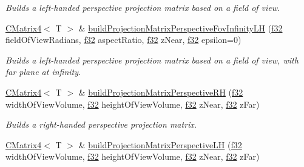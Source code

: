 \begin{DoxyCompactItemize}
\begin{DoxyCompactList}\small\item\em Builds a left-\/handed perspective projection matrix based on a field of view. \end{DoxyCompactList}\item 
\hyperlink{classirr_1_1core_1_1CMatrix4}{C\+Matrix4}$<$ T $>$ \& \hyperlink{classirr_1_1core_1_1CMatrix4_a3e4c3f6c545dd522f9f09177259f2f18}{build\+Projection\+Matrix\+Perspective\+Fov\+Infinity\+LH} (\hyperlink{namespaceirr_a0277be98d67dc26ff93b1a6a1d086b07}{f32} field\+Of\+View\+Radians, \hyperlink{namespaceirr_a0277be98d67dc26ff93b1a6a1d086b07}{f32} aspect\+Ratio, \hyperlink{namespaceirr_a0277be98d67dc26ff93b1a6a1d086b07}{f32} z\+Near, \hyperlink{namespaceirr_a0277be98d67dc26ff93b1a6a1d086b07}{f32} epsilon=0)\hypertarget{classirr_1_1core_1_1CMatrix4_a3e4c3f6c545dd522f9f09177259f2f18}{}\label{classirr_1_1core_1_1CMatrix4_a3e4c3f6c545dd522f9f09177259f2f18}

\begin{DoxyCompactList}\small\item\em Builds a left-\/handed perspective projection matrix based on a field of view, with far plane at infinity. \end{DoxyCompactList}\item 
\hyperlink{classirr_1_1core_1_1CMatrix4}{C\+Matrix4}$<$ T $>$ \& \hyperlink{classirr_1_1core_1_1CMatrix4_a649a29922f622503399bcb16c97b78b4}{build\+Projection\+Matrix\+Perspective\+RH} (\hyperlink{namespaceirr_a0277be98d67dc26ff93b1a6a1d086b07}{f32} width\+Of\+View\+Volume, \hyperlink{namespaceirr_a0277be98d67dc26ff93b1a6a1d086b07}{f32} height\+Of\+View\+Volume, \hyperlink{namespaceirr_a0277be98d67dc26ff93b1a6a1d086b07}{f32} z\+Near, \hyperlink{namespaceirr_a0277be98d67dc26ff93b1a6a1d086b07}{f32} z\+Far)\hypertarget{classirr_1_1core_1_1CMatrix4_a649a29922f622503399bcb16c97b78b4}{}\label{classirr_1_1core_1_1CMatrix4_a649a29922f622503399bcb16c97b78b4}

\begin{DoxyCompactList}\small\item\em Builds a right-\/handed perspective projection matrix. \end{DoxyCompactList}\item 
\hyperlink{classirr_1_1core_1_1CMatrix4}{C\+Matrix4}$<$ T $>$ \& \hyperlink{classirr_1_1core_1_1CMatrix4_a8306f02451b06f8e6710f23631654086}{build\+Projection\+Matrix\+Perspective\+LH} (\hyperlink{namespaceirr_a0277be98d67dc26ff93b1a6a1d086b07}{f32} width\+Of\+View\+Volume, \hyperlink{namespaceirr_a0277be98d67dc26ff93b1a6a1d086b07}{f32} height\+Of\+View\+Volume, \hyperlink{namespaceirr_a0277be98d67dc26ff93b1a6a1d086b07}{f32} z\+Near, \hyperlink{namespaceirr_a0277be98d67dc26ff93b1a6a1d086b07}{f32} z\+Far)\hypertarget{classirr_1_1core_1_1CMatrix4_a8306f02451b06f8e6710f23631654086}{}\label{classirr_1_1core_1_1CMatrix4_a8306f02451b06f8e6710f23631654086}


\end{DoxyCompactItemize}
